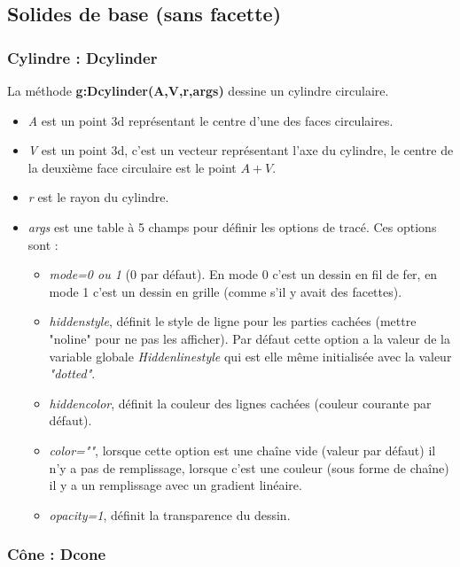 \documentclass[%
10pt,%
a4paper,%
french,%
]%
{article}%
\begin{document}
\subsection{Solides de base (sans facette)}

\subsubsection{ Cylindre : Dcylinder}

La méthode \textbf{g:Dcylinder(A,V,r,args)} dessine un cylindre circulaire.

\begin{itemize}
    \item \emph{A} est un point 3d représentant le centre d'une des faces circulaires.
    \item \emph{V} est un point 3d, c'est un vecteur représentant l'axe du cylindre, le centre de la deuxième face circulaire est le point $A+V$.
    \item \emph{r} est le rayon du cylindre.
    \item \emph{args} est une table à 5 champs pour définir les options de tracé. Ces options sont :
        \begin{itemize}
            \item \emph{mode=0 ou 1} (0 par défaut). En mode 0 c'est un dessin en fil de fer, en mode 1 c'est un dessin en grille (comme s'il y avait des facettes).
            \item \emph{hiddenstyle}, définit le style de ligne pour les parties cachées (mettre "noline" pour ne pas les afficher). Par défaut cette option a la valeur de la variable globale \emph{Hiddenlinestyle} qui est elle même initialisée avec la valeur \emph{"dotted"}.
            \item \emph{hiddencolor}, définit la couleur des lignes cachées (couleur courante par défaut).
            \item \emph{color=""}, lorsque cette option est une chaîne vide (valeur par défaut) il n'y a pas de remplissage,  lorsque c'est une couleur (sous forme de chaîne) il y a un remplissage avec un gradient linéaire.
            \item \emph{opacity=1}, définit la transparence du dessin.
        \end{itemize}
\end{itemize}

\subsubsection{ Cône : Dcone}
\end{document}
